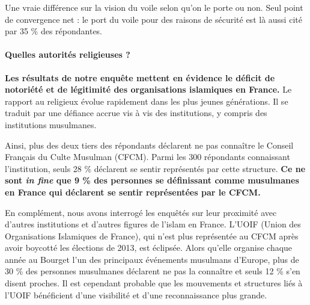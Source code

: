 \begin{Synthesis}
Une vraie différence sur la vision du voile selon qu'on le porte ou non. 
{Seul point de convergence net : le port du voile pour des
raisons de sécurité est là aussi cité par 35 \% des répondantes.}
\end{Synthesis}

\paragraph{Quelles autorités religieuses
?}


\textbf{Les résultats de notre enquête mettent en évidence le déficit de
notoriété et de légitimité des organisations islamiques en France.} Le
rapport au religieux évolue rapidement dans les plus jeunes générations.
Il se traduit par une défiance accrue vis à vis des institutions, y
compris des institutions musulmanes.

Ainsi, plus des deux tiers des répondants déclarent ne pas connaître le
Conseil Français du Culte Musulman (CFCM). Parmi les 300 répondants
connaissant l'institution, seuls 28 \% déclarent se sentir représentés
par cette structure. \textbf{Ce ne sont \emph{in fine} que 9 \% des
personnes se définissant comme musulmanes en France qui déclarent se
sentir représentées par le CFCM}\textbf{.}

En complément, nous avons interrogé les enquêtés sur leur proximité avec
d'autres institutions et d'autres figures de l'islam en France. 
L'UOIF
(Union des Organisations Islamiques de France), qui n'est plus
représentée au CFCM après avoir boycotté les élections de 2013, est
éclipsée. Alors qu'elle organise chaque année au Bourget l'un des
principaux événements musulmans d'Europe, plus de 30 \% des personnes
musulmanes déclarent ne pas la connaître et seuls 12 \% s'en disent
proches. Il est cependant probable que les mouvements et structures liés
à l'UOIF bénéficient d'une visibilité et d'une reconnaissance plus
grande.

